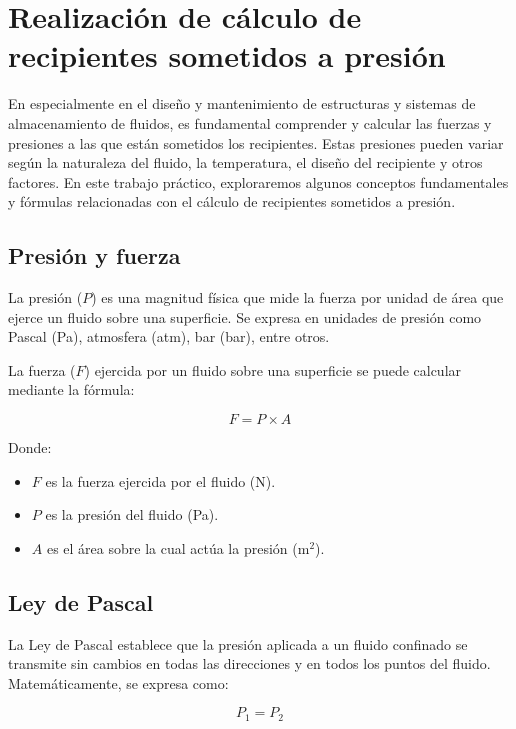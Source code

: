 \documentclass[../main]{subfiles}
\begin{document}
\section{Realización de cálculo de recipientes sometidos a presión}

En especialmente en el diseño y mantenimiento de estructuras y sistemas de almacenamiento de fluidos, es fundamental comprender y calcular las fuerzas y presiones a las que están sometidos los recipientes. Estas presiones pueden variar según la naturaleza del fluido, la temperatura, el diseño del recipiente y otros factores. En este trabajo práctico, exploraremos algunos conceptos fundamentales y fórmulas relacionadas con el cálculo de recipientes sometidos a presión.

\subsection{Presión y fuerza}

La presión ($P$) es una magnitud física que mide la fuerza por unidad de área que ejerce un fluido sobre una superficie. Se expresa en unidades de presión como Pascal (Pa), atmosfera (atm), bar (bar), entre otros.

La fuerza ($F$) ejercida por un fluido sobre una superficie se puede calcular mediante la fórmula:

\begin{equation}
F = P \times A
\end{equation}

Donde:
\begin{itemize}
    \item $F$ es la fuerza ejercida por el fluido (N).
    \item $P$ es la presión del fluido (Pa).
    \item $A$ es el área sobre la cual actúa la presión (m$^2$).
\end{itemize}

\subsection{Ley de Pascal}

La Ley de Pascal establece que la presión aplicada a un fluido confinado se transmite sin cambios en todas las direcciones y en todos los puntos del fluido. Matemáticamente, se expresa como:

\begin{equation}
P_1 = P_2
\end{equation}
\end{document}
